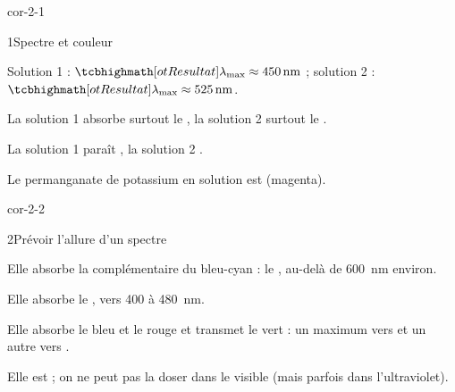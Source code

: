 \corrigesSouples

\begin{blocLivre}{cor-2-1}
\begin{corrige}{1}{Spectre et couleur}
\begin{questions}
\item Solution 1 : $\res{\lambda_{\max}\approx\qty{450}{nm}}$ ; solution 2 : $\res{\lambda_{\max}\approx\qty{525}{nm}}$.
\item La solution 1 absorbe surtout le , la solution 2 surtout le .
\item La solution 1 paraît , la solution 2 .
\item Le permanganate de potassium en solution est  (magenta).
\end{questions}
\end{corrige}
\end{blocLivre}
\begin{blocLivre}{cor-2-2}
\begin{corrige}{2}{Prévoir l'allure d'un spectre}
\begin{questions}
\item Elle absorbe la complémentaire du bleu-cyan : le , au-delà de \qty{600}{nm} environ.
\item Elle absorbe le , vers 400 à \qty{480}{nm}.
\item Elle absorbe le bleu et le rouge et transmet le vert : un maximum vers  et un autre vers .
\item Elle est  ; on ne peut pas la doser dans le visible (mais parfois dans l'ultraviolet).
\end{questions}
\end{corrige}
\end{blocLivre}
